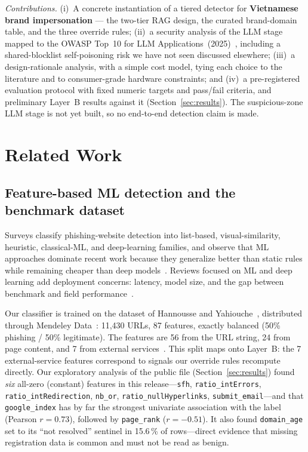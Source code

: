 \documentclass[conference]{IEEEtran}
\begin{document}
\emph{Contributions.} (i)~A concrete instantiation of a tiered detector for
\textbf{Vietnamese brand impersonation} --- the two-tier RAG design, the curated
brand-domain table, and the three override rules; (ii)~a security analysis of the
LLM stage mapped to the OWASP Top~10 for LLM Applications~(2025)~\cite{owasp2025llmtop10},
including a shared-blocklist self-poisoning risk we have not seen discussed
elsewhere; (iii)~a design-rationale analysis, with a simple cost model, tying
each choice to the literature and to consumer-grade hardware constraints; and
(iv)~a pre-registered evaluation protocol with fixed numeric targets and
pass/fail criteria, and preliminary Layer~B results against it
(Section~\ref{sec:results}). The suspicious-zone LLM stage is not yet built, so
no end-to-end detection claim is made.

\section{Related Work}

\subsection{Feature-based ML detection and the benchmark dataset}
Surveys classify phishing-website detection into list-based, visual-similarity,
heuristic, classical-ML, and deep-learning families, and observe that ML
approaches dominate recent work because they generalize better than static rules
while remaining cheaper than deep models~\cite{safi2023slr}. Reviews focused on ML
and deep learning add deployment concerns: latency, model size, and the gap
between benchmark and field performance~\cite{divakaran2022review}.

Our classifier is trained on the dataset of Hannousse and
Yahiouche~\cite{hannousse2021benchmark}, distributed through Mendeley
Data~\cite{hannousse2021dataset}: 11{,}430 URLs, 87 features, exactly balanced
(50\% phishing / 50\% legitimate). The features are 56 from the URL string, 24
from page content, and 7 from external services~\cite{hannousse2021benchmark}.
This split maps onto Layer~B: the 7 external-service features correspond to
signals our override rules recompute directly. Our exploratory analysis of the
public file (Section~\ref{sec:results}) found \emph{six} all-zero (constant)
features in this release---\texttt{sfh}, \texttt{ratio\_intErrors},
\texttt{ratio\_intRedirection}, \texttt{nb\_or}, \texttt{ratio\_nullHyperlinks},
\texttt{submit\_email}---and that \texttt{google\_index} has by far the strongest
univariate association with the label (Pearson $r=0.73$), followed by
\texttt{page\_rank} ($r=-0.51$). It also found \texttt{domain\_age} set to its
``not resolved'' sentinel in 15.6\,\% of rows---direct evidence that missing
registration data is common and must not be read as benign.
\end{document}

